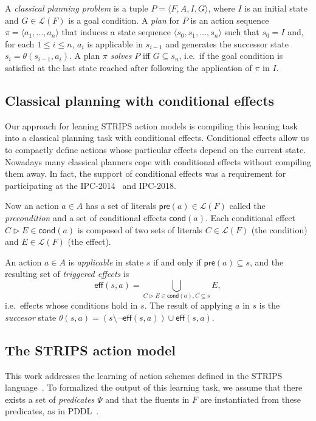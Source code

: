 \documentclass[letterpaper]{article} %
\newcommand{\tup}[1]{{\langle #1 \rangle}}
\newcommand{\pre}{\mathsf{pre}}     %
\newcommand{\eff}{\mathsf{eff}}     %
\newcommand{\cond}{\mathsf{cond}}   %
\begin{document}
A {\em classical planning problem} is a tuple $P=\tup{F,A,I,G}$, where $I$ is an initial state and $G\in\mathcal{L}(F)$ is a goal condition. A {\em plan} for $P$ is an action sequence $\pi=\tup{a_1, \ldots, a_n}$ that induces a state sequence $\tup{s_0, s_1, \ldots, s_n}$ such that $s_0=I$ and, for each {\small $1\leq i\leq n$}, $a_i$ is applicable in $s_{i-1}$ and generates the successor state $s_i=\theta(s_{i-1},a_i)$. A plan $\pi$ {\em solves} $P$ iff $G\subseteq s_n$, i.e.~if the goal condition is satisfied at the last state reached after following the application of $\pi$ in $I$.


\subsection{Classical planning with conditional effects}
Our approach for leaning STRIPS action models is compiling this leaning task into a classical planning task with conditional effects. Conditional effects allow us to compactly define actions whose particular effects depend on the current state. Nowadays many classical planners cope with conditional effects without compiling them away. In fact, the support of conditional effects was a requirement for participating at the IPC-2014~\cite{vallati:IPC:AIM2015} and IPC-2018.

Now an action $a\in A$ has a set of literals $\pre(a)\in\mathcal{L}(F)$ called the {\em precondition} and a set of conditional effects $\cond(a)$. Each conditional effect $C\rhd E\in\cond(a)$ is composed of two sets of literals $C\in\mathcal{L}(F)$ (the condition) and $E\in\mathcal{L}(F)$ (the effect).

An action $a\in A$ is {\em applicable} in state $s$ if and only if $\pre(a)\subseteq s$, and the resulting set of {\em triggered effects} is
\[
\eff(s,a)=\bigcup_{C\rhd E\in\cond(a),C\subseteq s} E,
\]
i.e.~effects whose conditions hold in $s$. The result of applying $a$ in $s$ is the {\em succesor} state $\theta(s,a)=(s\setminus \neg \eff(s,a))\cup\eff(s,a)$.


\subsection{The STRIPS action model}
This work addresses the learning of action schemes defined in the STRIPS language~\cite{fikes1971strips}. To formalized the output of this learning task, we assume that there exists a set of {\em predicates} $\Psi$ and that the fluents in $F$ are instantiated from these predicates, as in PDDL~\cite{mcdermott1998pddl,fox2003pddl2}.
\end{document}
